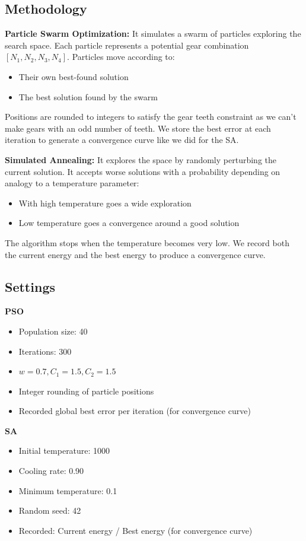 \subsection{Methodology}

\textbf{Particle Swarm Optimization:}
It simulates a swarm of particles exploring the search space. Each particle represents a potential gear combination $[N_1,N_2,N_3,N_4]$.
Particles move according to:
\begin{itemize}
    \item Their own best-found solution
    \item The best solution found by the swarm
\end{itemize}
Positions are rounded to integers to satisfy the gear teeth constraint as we can’t make gears with an odd number of teeth.
We store the best error at each iteration to generate a convergence curve like we did for the SA.

\textbf{Simulated Annealing:}
It explores the space by randomly perturbing the current solution. It accepts worse solutions with a probability depending on analogy to a temperature parameter:
\begin{itemize}
    \item With high temperature goes a wide exploration
    \item Low temperature goes a convergence around a good solution
\end{itemize}
The algorithm stops when the temperature becomes very low. We record both the current energy and the best energy to produce a convergence curve.

\subsection{Settings}

\textbf{PSO}
\begin{itemize}
    \item Population size: 40
    \item Iterations: 300
    \item $w=0.7, C_1=1.5, C_2=1.5$
    \item Integer rounding of particle positions
    \item Recorded global best error per iteration (for convergence curve)
\end{itemize}

\textbf{SA}
\begin{itemize}
    \item Initial temperature: 1000
    \item Cooling rate: 0.90
    \item Minimum temperature: 0.1
    \item Random seed: 42
    \item Recorded: Current energy / Best energy (for convergence curve)
\end{itemize}

